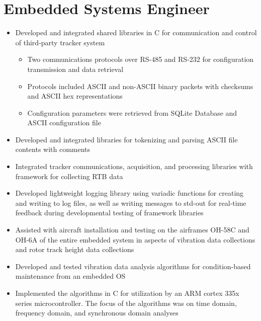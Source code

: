 \documentclass[10pt,a4paper]{article}
\begin{document}
\section{Embedded Systems Engineer}
\begin{itemize}
  \item Developed and integrated shared libraries in C for communication and control of
  third-party tracker system
  \begin{itemize}
    \item Two communications protocols over RS-485 and RS-232 for configuration
    transmission and data retrieval

    \item Protocols included ASCII and non-ASCII binary packets with checksums and ASCII
    hex representations

    \item Configuration parameters were retrieved from SQLite Database and ASCII
    configuration file
  \end{itemize}

  \item Developed and integrated libraries for tokenizing and parsing ASCII file contents
  with comments

  \item Integrated tracker communications, acquisition, and processing libraries with
  framework for collecting RTB data

  \item Developed lightweight logging library using variadic functions for creating and
  writing to log files, as well as writing messages to std-out for real-time feedback
  during developmental testing of framework libraries

  \item Assisted with aircraft installation and testing on the airframes OH-58C and OH-6A of
  the entire embedded system in aspects of vibration data collections and rotor track
  height data collections

  \item Developed and tested vibration data analysis algorithms for condition-based maintenance
  from an embedded OS

  \item Implemented the algorithms in C for utilization by an ARM cortex 335x series
  microcontroller. The focus of the algorithms was on time domain, frequency domain, and
  synchronous domain analyses


\end{itemize}
\end{document}
